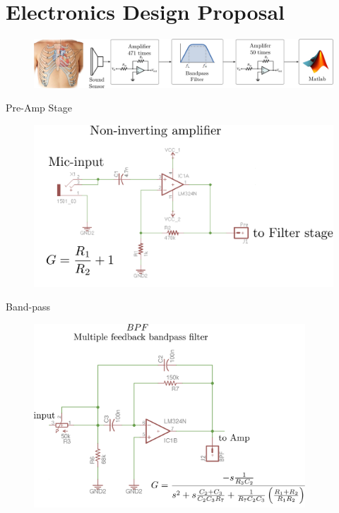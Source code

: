 \documentclass[newPxFont]{beamer}
\begin{document}
\section{Electronics Design Proposal}
\begin{frame}
\begin{figure}
  \includegraphics[width=4.5in]{pcgMethodology}
\end{figure}
\end{frame}
\begin{frame}{Pre-Amp Stage}
\begin{figure}
  \includegraphics[width=4.5in]{preAmpStage}
\end{figure}
\end{frame}
\begin{frame}{Band-pass}
\begin{figure}
  \includegraphics[width=4in]{bpfStage}
\end{figure}
\end{frame}
\end{document}
